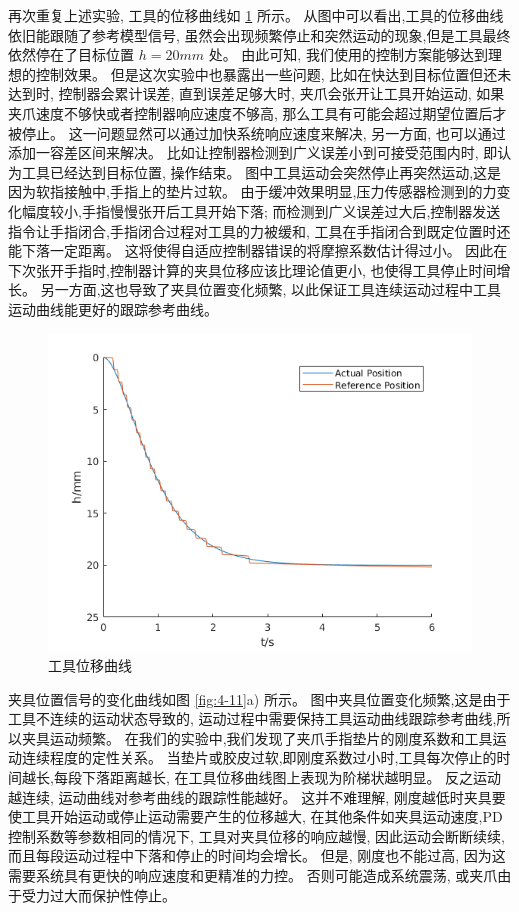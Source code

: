 再次重复上述实验, 工具的位移曲线如 \ref{fig:h_x} 所示。
从图中可以看出,工具的位移曲线依旧能跟随了参考模型信号,
虽然会出现频繁停止和突然运动的现象,但是工具最终依然停在了目标位置 $h = 20 mm$ 处。
由此可知, 我们使用的控制方案能够达到理想的控制效果。
但是这次实验中也暴露出一些问题, 比如在快达到目标位置但还未达到时,
控制器会累计误差, 直到误差足够大时, 夹爪会张开让工具开始运动,
如果夹爪速度不够快或者控制器响应速度不够高, 那么工具有可能会超过期望位置后才被停止。
这一问题显然可以通过加快系统响应速度来解决, 另一方面, 也可以通过添加一容差区间来解决。
比如让控制器检测到广义误差小到可接受范围内时, 即认为工具已经达到目标位置, 操作结束。
图中工具运动会突然停止再突然运动,这是因为软指接触中,手指上的垫片过软。
由于缓冲效果明显,压力传感器检测到的力变化幅度较小,手指慢慢张开后工具开始下落;
而检测到广义误差过大后,控制器发送指令让手指闭合,手指闭合过程对工具的力被缓和,
工具在手指闭合到既定位置时还能下落一定距离。
这将使得自适应控制器错误的将摩擦系数估计得过小。
因此在下次张开手指时,控制器计算的夹具位移应该比理论值更小, 也使得工具停止时间增长。
另一方面,这也导致了夹具位置变化频繁,
以此保证工具连续运动过程中工具运动曲线能更好的跟踪参考曲线。

\begin{figure}[!ht]
  \centering
  \includegraphics[width=12cm]{chapter04/pic/h_x}
  \caption{\label{fig:h_x}
    工具位移曲线}
  \vspace{-0.3cm}
\end{figure}


夹具位置信号的变化曲线如图 \ref{fig:4-11}a) 所示。
图中夹具位置变化频繁,这是由于工具不连续的运动状态导致的,
运动过程中需要保持工具运动曲线跟踪参考曲线,所以夹具运动频繁。
在我们的实验中,我们发现了夹爪手指垫片的刚度系数和工具运动连续程度的定性关系。
当垫片或胶皮过软,即刚度系数过小时,工具每次停止的时间越长,每段下落距离越长,
在工具位移曲线图上表现为阶梯状越明显。
反之运动越连续, 运动曲线对参考曲线的跟踪性能越好。
这并不难理解, 刚度越低时夹具要使工具开始运动或停止运动需要产生的位移越大,
在其他条件如夹具运动速度,PD控制系数等参数相同的情况下, 工具对夹具位移的响应越慢,
因此运动会断断续续, 而且每段运动过程中下落和停止的时间均会增长。
但是, 刚度也不能过高, 因为这需要系统具有更快的响应速度和更精准的力控。
否则可能造成系统震荡, 或夹爪由于受力过大而保护性停止。

